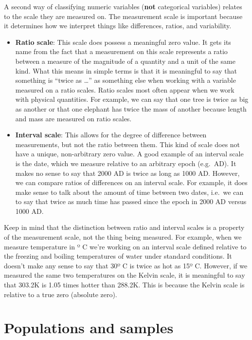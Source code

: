 \documentclass[
]{book}
\begin{document}
A second way of classifying numeric variables (\textbf{not} categorical variables) relates to the scale they are measured on. The measurement scale is important because it determines how we interpret things like differences, ratios, and variability.

\begin{itemize}
\item
  \textbf{Ratio scale}: This scale does possess a meaningful zero value. It gets its name from the fact that a measurement on this scale represents a ratio between a measure of the magnitude of a quantity and a unit of the same kind. What this means in simple terms is that it is meaningful to say that something is ``twice as \ldots{}'' as something else when working with a variable measured on a ratio scales. Ratio scales most often appear when we work with physical quantities. For example, we can say that one tree is twice as big as another or that one elephant has twice the mass of another because length and mass are measured on ratio scales.
\item
  \textbf{Interval scale}: This allows for the degree of difference between measurements, but not the ratio between them. This kind of scale does not have a unique, non-arbitrary zero value. A good example of an interval scale is the date, which we measure relative to an arbitrary epoch (e.g.~AD). It makes no sense to say that 2000 AD is twice as long as 1000 AD. However, we can compare ratios of differences on an interval scale. For example, it does make sense to talk about the amount of time between two dates, i.e.~we can to say that twice as much time has passed since the epoch in 2000 AD versus 1000 AD.
\end{itemize}

Keep in mind that the distinction between ratio and interval scales is a property of the measurement scale, not the thing being measured. For example, when we measure temperature in º C we're working on an interval scale defined relative to the freezing and boiling temperatures of water under standard conditions. It doesn't make any sense to say that 30º C is twice as hot as 15º C. However, if we measured the same two temperatures on the Kelvin scale, it is meaningful to say that 303.2K is 1.05 times hotter than 288.2K. This is because the Kelvin scale is relative to a true zero (absolute zero).

\hypertarget{populations-samples}{%
\section{Populations and samples}\label{populations-samples}}
\end{document}
